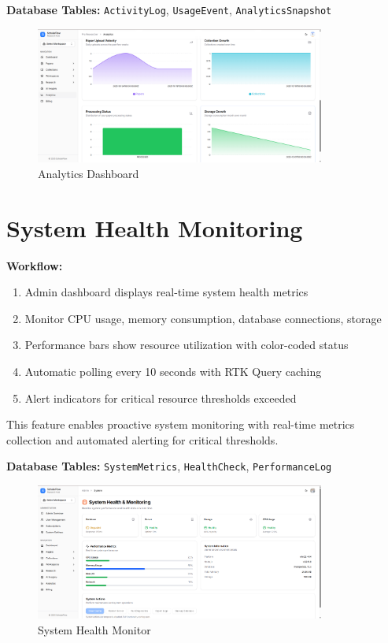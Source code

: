 \textbf{Database Tables:} \texttt{ActivityLog}, \texttt{UsageEvent}, \texttt{AnalyticsSnapshot}

\begin{figure}[H]
\centering
\includegraphics[width=0.85\textwidth]{images/screenshots/analytics.png}
\caption{Analytics Dashboard}
\label{fig:analytics}
\end{figure}

\section{System Health Monitoring}

\textbf{Workflow:}
\begin{enumerate}[leftmargin=*,topsep=3pt,itemsep=2pt]
    \item Admin dashboard displays real-time system health metrics
    \item Monitor CPU usage, memory consumption, database connections, storage
    \item Performance bars show resource utilization with color-coded status
    \item Automatic polling every 10 seconds with RTK Query caching
    \item Alert indicators for critical resource thresholds exceeded
\end{enumerate}

\vspace{0.2cm}
\noindent
This feature enables proactive system monitoring with real-time metrics collection and automated alerting for critical thresholds.

\textbf{Database Tables:} \texttt{SystemMetrics}, \texttt{HealthCheck}, \texttt{PerformanceLog}

\begin{figure}[H]
\centering
\includegraphics[width=0.85\textwidth]{images/screenshots/system_health.png}
\caption{System Health Monitor}
\label{fig:health}
\end{figure}
